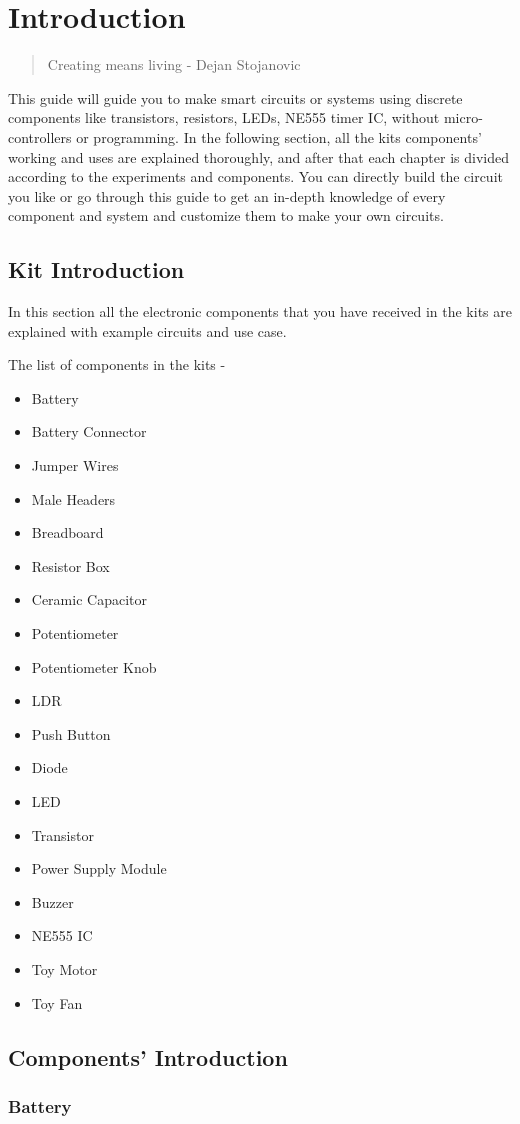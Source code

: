 

\chapter{Introduction}

\begin{quote}
    Creating means living - Dejan Stojanovic
\end{quote}
This guide will guide you to make smart circuits or systems using discrete components like transistors, resistors, LEDs, NE555 timer IC, without micro-controllers or programming.
In the following section, all the kits components' working and uses are explained thoroughly, and after that each chapter is divided according to the experiments and components. You can directly build the circuit you like or go through this guide to get an in-depth knowledge of every component and system and customize them to make your own circuits.

\section{Kit Introduction}
In this section all the electronic components that you have received in the kits are explained with example circuits and use case.

The list of components in the kits - 
\begin{itemize}
\item Battery
\item Battery Connector
\item Jumper Wires
\item Male Headers
\item Breadboard
\item Resistor Box
\item Ceramic Capacitor
\item Potentiometer
\item Potentiometer Knob
\item LDR
\item Push Button
\item Diode
\item LED
\item Transistor
\item Power Supply Module
\item Buzzer
\item NE555 IC
\item Toy Motor
\item Toy Fan
\end{itemize}

\section{Components' Introduction}

\subsection{Battery}